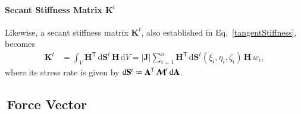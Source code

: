 \paragraph{Secant Stiffness Matrix $\mathbf{K}^t$}

Likewise, a secant stiffness matrix $\mathbf{K}^t$, also established in Eq.~\ref{tangentStiffness}, becomes 
\begin{equation} 
	\begin{aligned}
		\mathbf{K}^t & = \int_{V} \mathbf{H}^{\mathsf{T}} \,  \mathrm{d} \mathbf{S}^t \, \mathbf{H}  \,  \mathrm{d} V
		= | \mathbf{J} | \sum_{i=1}^{n}  \mathbf{H}^{\mathsf{T}} \,  \mathrm{d} \mathbf{S}^t (\xi_i, \eta_i, \zeta_i) \, \mathbf{H} \, w_i  ,
	\end{aligned}
\end{equation}
where its stress rate is given by $\mathrm{d} \mathbf{S}^t \defeq \mathbf{A}^{\mathsf{T}} \, \boldsymbol{\mathcal{M}}^t \, \mathrm{d} \mathbf{A}$.




\subsection{$\,$Force Vector}
\label{secForceVectors}





